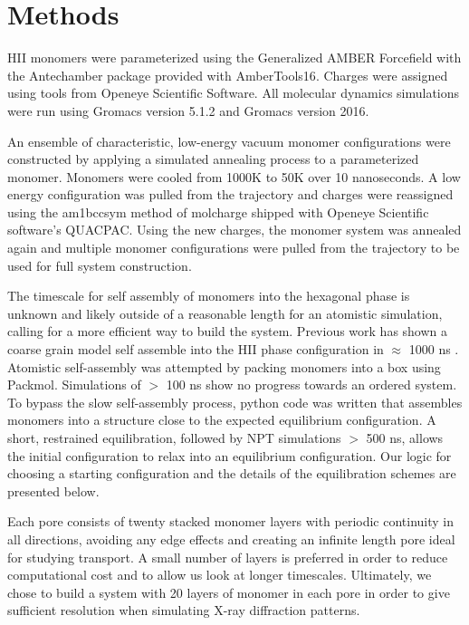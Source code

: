 \section{Methods}
	
HII monomers were parameterized using the Generalized AMBER Forcefield
\cite{wang_development_2004} with the Antechamber package\cite{wang_automatic_2006}
provided with AmberTools16\cite{case_ambertools16_2016}. Charges were
assigned using tools from Openeye Scientific Software. All molecular 
dynamics simulations were run using Gromacs version 5.1.2 and Gromacs 
version 2016. \cite{bekker_gromacs:_1993,berendsen_gromacs:_1995,
van_der_spoel_gromacs:_2005,hess_gromacs_2008}
	
An ensemble of characteristic, low-energy vacuum monomer configurations
were constructed by applying a simulated annealing process to a
parameterized monomer. Monomers were cooled from 1000K to 50K over 10
nanoseconds. A low energy configuration was pulled from the trajectory 
and charges were reassigned using the am1bccsym method of molcharge
shipped with Openeye Scientific software's QUACPAC. Using the new
charges, the monomer system was annealed again and multiple monomer
configurations were pulled from the trajectory to be used for full
system construction.
	
The timescale for self assembly of monomers into the hexagonal phase is
unknown and likely outside of a reasonable length for an atomistic
simulation, calling for a more efficient way to build the system. 
Previous work has shown a coarse grain model self assemble into the HII
phase configuration in $\approx$ 1000 ns \cite{mondal_self-assembly_2013}.
Atomistic self-assembly was attempted by packing monomers into a box 
using Packmol\cite{martinez_packmol:_2009}. Simulations of $>$ 100 ns 
show no progress towards an ordered system. To bypass the slow self-assembly
process, python code was written that assembles monomers into a structure 
close to the expected equilibrium configuration. A short, restrained 
equilibration, followed by NPT simulations $>$ 500 ns, allows the initial
configuration to relax into an equilibrium configuration. Our logic for
choosing a starting configuration and the details of the equilibration 
schemes are presented below.

Each pore consists of twenty stacked monomer layers with periodic 
continuity in all directions, avoiding any edge effects and creating an
infinite length pore ideal for studying transport. A small number of
layers is preferred in order to reduce computational cost and to allow
us look at longer timescales. Ultimately, we chose to build a system
with 20 layers of monomer in each pore in order to give sufficient
resolution when simulating X-ray diffraction patterns.

